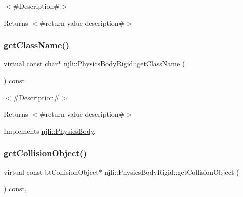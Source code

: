 $<$\#\+Description\#$>$

\begin{DoxyReturn}{Returns}
$<$\#return value description\#$>$ 
\end{DoxyReturn}
\mbox{\label{classnjli_1_1_physics_body_rigid_a13a8810e9ddca12e83bbbe6676e8c906}} 
\subsubsection{\texorpdfstring{get\+Class\+Name()}{getClassName()}}
{\footnotesize\ttfamily virtual const char$\ast$ njli\+::\+Physics\+Body\+Rigid\+::get\+Class\+Name (\begin{DoxyParamCaption}{ }\end{DoxyParamCaption}) const\hspace{0.3cm}{\ttfamily [virtual]}}

$<$\#\+Description\#$>$

\begin{DoxyReturn}{Returns}
$<$\#return value description\#$>$ 
\end{DoxyReturn}


Implements \mbox{\hyperlink{classnjli_1_1_physics_body_a9ba235d39a1b994f22a13edeff862ba3}{njli\+::\+Physics\+Body}}.

\mbox{\label{classnjli_1_1_physics_body_rigid_aa92b1f7c329ae49a2ad80947db1dd7ba}} 
\subsubsection{\texorpdfstring{get\+Collision\+Object()}{getCollisionObject()}\hspace{0.1cm}{\footnotesize\ttfamily [1/2]}}
{\footnotesize\ttfamily virtual const bt\+Collision\+Object$\ast$ njli\+::\+Physics\+Body\+Rigid\+::get\+Collision\+Object (\begin{DoxyParamCaption}{ }\end{DoxyParamCaption}) const\hspace{0.3cm}{\ttfamily [protected]}, {\ttfamily [virtual]}}




